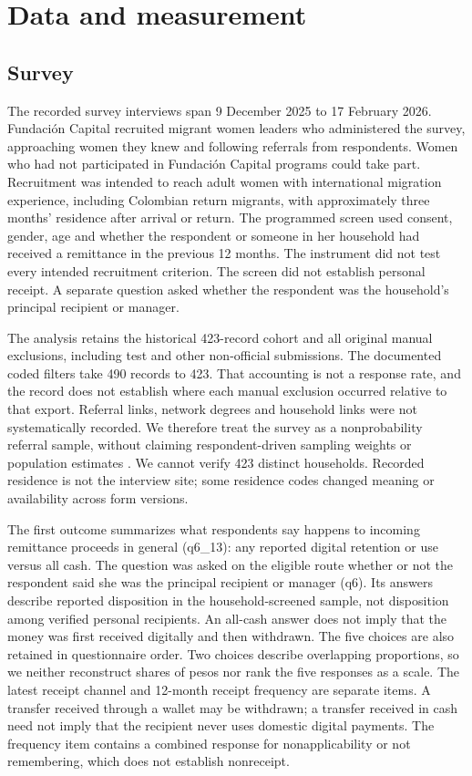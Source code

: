 \section{Data and measurement}
\subsection{Survey}
The recorded survey interviews span 9 December 2025 to 17 February 2026. Fundación Capital recruited migrant women leaders who administered the survey, approaching women they knew and following referrals from respondents. Women who had not participated in Fundación Capital programs could take part. Recruitment was intended to reach adult women with international migration experience, including Colombian return migrants, with approximately three months' residence after arrival or return. The programmed screen used consent, gender, age and whether the respondent or someone in her household had received a remittance in the previous 12 months. The instrument did not test every intended recruitment criterion. The screen did not establish personal receipt. A separate question asked whether the respondent was the household's principal recipient or manager.

The analysis retains the historical 423-record cohort and all original manual exclusions, including test and other non-official submissions. The documented coded filters take 490 records to 423. That accounting is not a response rate, and the record does not establish where each manual exclusion occurred relative to that export. Referral links, network degrees and household links were not systematically recorded. We therefore treat the survey as a nonprobability referral sample, without claiming respondent-driven sampling weights or population estimates \citep{gileHandcock2010}. We cannot verify 423 distinct households. Recorded residence is not the interview site; some residence codes changed meaning or availability across form versions.

The first outcome summarizes what respondents say happens to incoming remittance proceeds in general (q6\_13): any reported digital retention or use versus all cash. The question was asked on the eligible route whether or not the respondent said she was the principal recipient or manager (q6). Its answers describe reported disposition in the household-screened sample, not disposition among verified personal recipients. An all-cash answer does not imply that the money was first received digitally and then withdrawn. The five choices are also retained in questionnaire order. Two choices describe overlapping proportions, so we neither reconstruct shares of pesos nor rank the five responses as a scale. The latest receipt channel and 12-month receipt frequency are separate items. A transfer received through a wallet may be withdrawn; a transfer received in cash need not imply that the recipient never uses domestic digital payments. The frequency item contains a combined response for nonapplicability or not remembering, which does not establish nonreceipt.

